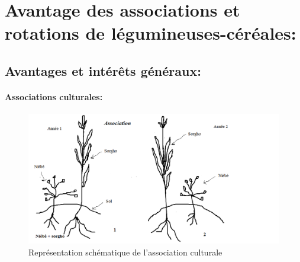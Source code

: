 \documentclass[a4paper,11pt]{article}
\begin{document}
\section{Avantage des associations et rotations de légumineuses-céréales:}



\subsection{ Avantages et intérêts généraux:}

\paragraph{Associations culturales:}


\begin{figure}%
 \begin{center}
  \includegraphics[width=18cm]{images/Association}
 \end{center}
  \caption{ Représentation schématique de l’association culturale}
\end{figure}
\end{document}
